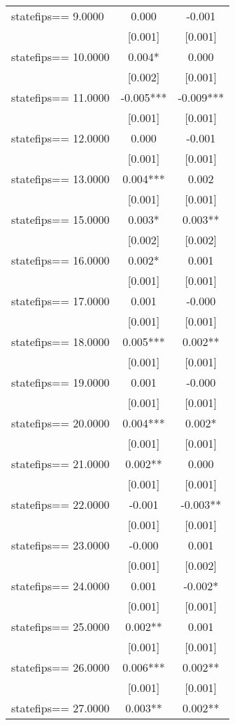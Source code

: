 \documentclass[]{article}
\begin{document}
\begin{tabular}{lcc}
statefips==     9.0000 & 0.000 & -0.001 \\
 & [0.001] & [0.001] \\
statefips==    10.0000 & 0.004* & 0.000 \\
 & [0.002] & [0.001] \\
statefips==    11.0000 & -0.005*** & -0.009*** \\
 & [0.001] & [0.001] \\
statefips==    12.0000 & 0.000 & -0.001 \\
 & [0.001] & [0.001] \\
statefips==    13.0000 & 0.004*** & 0.002 \\
 & [0.001] & [0.001] \\
statefips==    15.0000 & 0.003* & 0.003** \\
 & [0.002] & [0.002] \\
statefips==    16.0000 & 0.002* & 0.001 \\
 & [0.001] & [0.001] \\
statefips==    17.0000 & 0.001 & -0.000 \\
 & [0.001] & [0.001] \\
statefips==    18.0000 & 0.005*** & 0.002** \\
 & [0.001] & [0.001] \\
statefips==    19.0000 & 0.001 & -0.000 \\
 & [0.001] & [0.001] \\
statefips==    20.0000 & 0.004*** & 0.002* \\
 & [0.001] & [0.001] \\
statefips==    21.0000 & 0.002** & 0.000 \\
 & [0.001] & [0.001] \\
statefips==    22.0000 & -0.001 & -0.003** \\
 & [0.001] & [0.001] \\
statefips==    23.0000 & -0.000 & 0.001 \\
 & [0.001] & [0.002] \\
statefips==    24.0000 & 0.001 & -0.002* \\
 & [0.001] & [0.001] \\
statefips==    25.0000 & 0.002** & 0.001 \\
 & [0.001] & [0.001] \\
statefips==    26.0000 & 0.006*** & 0.002** \\
 & [0.001] & [0.001] \\
statefips==    27.0000 & 0.003** & 0.002** \\

\end{tabular}
\end{document}
